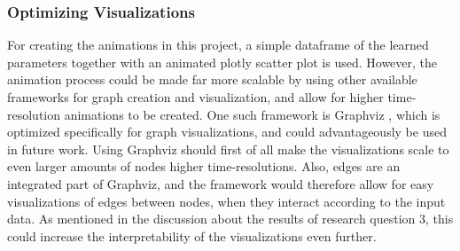 \subsubsection{Optimizing Visualizations}
For creating the animations in this project, a simple dataframe of the learned parameters together with an animated plotly \cite{PlotlyPlotly} scatter plot is used. 
However, the animation process could be made far more scalable by using other available frameworks for graph creation and visualization, and allow for higher time-resolution animations to be created. 
One such framework is Graphviz \cite{Graphviz}, which is optimized specifically for graph visualizations, and could advantageously be used in future work. 
Using Graphviz should first of all make the visualizations scale to even larger amounts of nodes higher time-resolutions. 
Also, edges are an integrated part of Graphviz, and the framework would therefore allow for easy visualizations of edges between nodes, when they interact according to the input data. As mentioned in the discussion about the results of research question 3, this could increase the interpretability of the visualizations even further. 